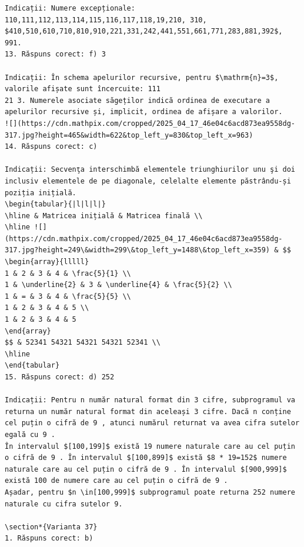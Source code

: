 \documentclass[10pt]{article}
\begin{document}
\begin{verbatim}
Indicații: Numere excepționale: 110,111,112,113,114,115,116,117,118,19,210, 310, $410,510,610,710,810,910,221,331,242,441,551,661,771,283,881,392$, 991.
13. Răspuns corect: f) 3

Indicații: În schema apelurilor recursive, pentru $\mathrm{n}=3$, valorile afișate sunt încercuite: 111
21 3. Numerele asociate săgeților indică ordinea de executare a apelurilor recursive și, implicit, ordinea de afișare a valorilor.
![](https://cdn.mathpix.com/cropped/2025_04_17_46e04c6acd873ea9558dg-317.jpg?height=465&width=622&top_left_y=830&top_left_x=963)
14. Răspuns corect: c)

Indicații: Secvenţa interschimbă elementele triunghiurilor unu şi doi inclusiv elementele de pe diagonale, celelalte elemente păstrându-și poziția inițială.
\begin{tabular}{|l|l|l|}
\hline & Matricea inițială & Matricea finală \\
\hline ![](https://cdn.mathpix.com/cropped/2025_04_17_46e04c6acd873ea9558dg-317.jpg?height=249\&width=299\&top_left_y=1488\&top_left_x=359) & $$
\begin{array}{lllll}
1 & 2 & 3 & 4 & \frac{5}{1} \\
1 & \underline{2} & 3 & \underline{4} & \frac{5}{2} \\
1 & = & 3 & 4 & \frac{5}{5} \\
1 & 2 & 3 & 4 & 5 \\
1 & 2 & 3 & 4 & 5
\end{array}
$$ & 52341 54321 54321 54321 52341 \\
\hline
\end{tabular}
15. Răspuns corect: d) 252

Indicații: Pentru n număr natural format din 3 cifre, subprogramul va returna un număr natural format din aceleași 3 cifre. Dacă n conține cel puțin o cifră de 9 , atunci numărul returnat va avea cifra sutelor egală cu 9 .
În intervalul $[100,199]$ există 19 numere naturale care au cel puțin o cifră de 9 . În intervalul $[100,899]$ există $8 * 19=152$ numere naturale care au cel puțin o cifră de 9 . În intervalul $[900,999]$ există 100 de numere care au cel puțin o cifră de 9 .
Așadar, pentru $n \in[100,999]$ subprogramul poate returna 252 numere naturale cu cifra sutelor 9.

\section*{Varianta 37}
1. Răspuns corect: b)


\end{verbatim}
\end{document}
